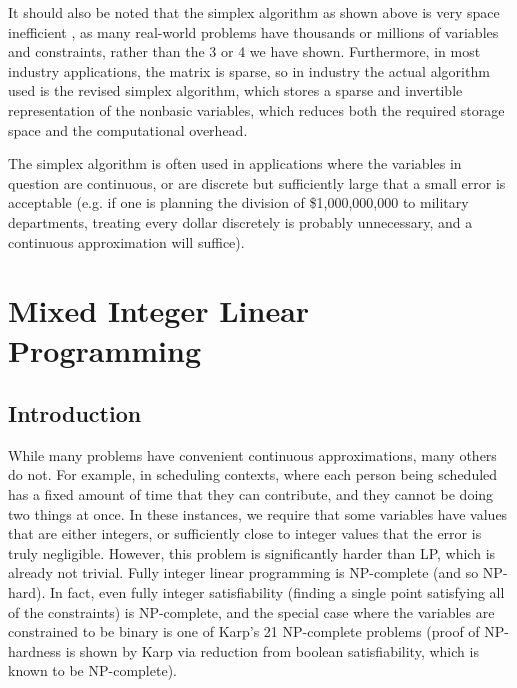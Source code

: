 \documentclass[10pt]{article}
\begin{document}
It should also be noted that the simplex algorithm as shown above is very space inefficient \cite{morgan}, as many real-world problems have thousands or millions of variables and constraints\cite{gurobi-blue-yonder}, rather than the 3 or 4 we have shown. Furthermore, in most industry applications, the matrix is sparse, so in industry the actual algorithm used is the revised simplex algorithm\cite{morgan}, which stores a sparse and invertible representation of the nonbasic variables, which reduces both the required storage space and the computational overhead. 

The simplex algorithm is often used in applications where the variables in question are continuous, or are discrete but sufficiently large that a small error is acceptable (e.g. if one is planning the division of \$1,000,000,000 to military departments, treating every dollar discretely is probably unnecessary, and a continuous approximation will suffice).
\section{Mixed Integer Linear Programming}
\subsection{Introduction}
While many problems have convenient continuous approximations, many others do not. For example, in scheduling contexts, where each person being scheduled has a fixed amount of time that they can contribute, and they cannot be doing two things at once. In these instances, we require that some variables have values that are either integers, or sufficiently close to integer values that the error is truly negligible. However, this problem is significantly harder than LP, which is already not trivial. Fully integer linear programming is NP-complete (and so NP-hard). In fact, even fully integer satisfiability (finding a single point satisfying all of the constraints) is NP-complete, and the special case where the variables are constrained to be binary is one of Karp's 21 NP-complete problems (proof of NP-hardness is shown by Karp via reduction from boolean satisfiability, which is known to be NP-complete)\cite{karp,cook}.
\end{document}
